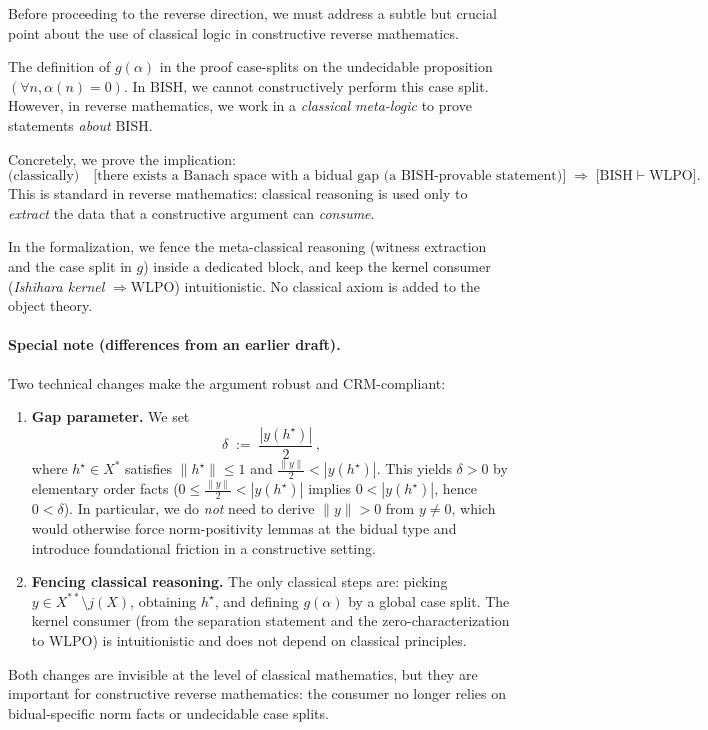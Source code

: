 \documentclass[11pt]{article}
\newcommand{\WLPO}{\mathrm{WLPO}}
\newcommand{\BISH}{\mathrm{BISH}}
\begin{document}
Before proceeding to the reverse direction, we must address a subtle but crucial point about the use of classical logic in constructive reverse mathematics.

\begin{rem}\label{rem:meta-classical}
The definition of $g(\alpha)$ in the proof case-splits on the undecidable proposition
$(\forall n,\alpha(n)=0)$. In $\BISH$, we cannot constructively perform this case split.
However, in reverse mathematics, we work in a \emph{classical meta-logic} to prove
statements \emph{about} $\BISH$.

Concretely, we prove the implication:
\[
  \text{(classically)}\quad
  \big[\text{there exists a Banach space with a bidual gap (a $\BISH$-provable statement)}\big]
  \;\Longrightarrow\;
  \big[\BISH \vdash \WLPO\big].
\]
This is standard in reverse mathematics: classical reasoning is used only to
\emph{extract} the data that a constructive argument can \emph{consume}.

In the formalization, we fence the meta-classical reasoning (witness extraction and
the case split in $g$) inside a dedicated block, and keep the kernel consumer
(\emph{Ishihara kernel} $\Rightarrow \WLPO$) intuitionistic. No classical axiom
is added to the object theory.
\end{rem}

\paragraph{Special note (differences from an earlier draft).}
Two technical changes make the argument robust and CRM-compliant:
\begin{enumerate}
  \item \textbf{Gap parameter.} We set
  \[
    \delta \;:=\; \frac{|y(h^\star)|}{2}\,,
  \]
  where $h^\star\in X^\ast$ satisfies $\|h^\star\|\le 1$ and
  $\tfrac{\|y\|}{2}<|y(h^\star)|$. This yields $\delta>0$ by elementary
  order facts ($0\le \tfrac{\|y\|}{2} < |y(h^\star)|$ implies $0<|y(h^\star)|$,
  hence $0<\delta$). In particular, we do \emph{not} need to derive $\|y\|>0$
  from $y\neq 0$, which would otherwise force norm-positivity lemmas at the bidual
  type and introduce foundational friction in a constructive setting.
  \item \textbf{Fencing classical reasoning.} The only classical steps are:
  picking $y\in X^{**}\!\setminus j(X)$, obtaining $h^\star$, and
  defining $g(\alpha)$ by a global case split. The kernel consumer
  (from the separation statement and the zero-characterization to $\WLPO$)
  is intuitionistic and does not depend on classical principles.
\end{enumerate}
Both changes are invisible at the level of classical mathematics, but they are
important for constructive reverse mathematics: the consumer no longer relies on
bidual-specific norm facts or undecidable case splits.
\end{document}
